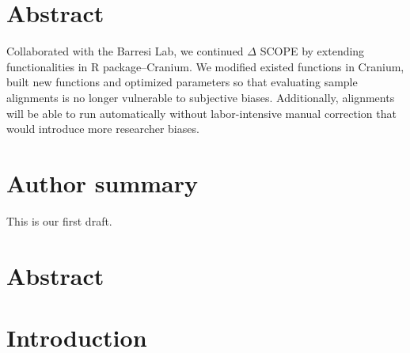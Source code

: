 \documentclass[10pt,letterpaper]{article}
\newcommand{\getIndex}[2]{
  \ForEach{,}{\IfEq{#1}{\thislevelitem}{\number\thislevelcount\ExitForEach}{}}{#2}
}
\newcommand{\getAff}[1]{
  \getIndex{#1}{}
}
\begin{document}
\vspace*{0.2in}

\section*{Abstract}
Collaborated with the Barresi Lab, we continued \(\Delta\) SCOPE by
extending functionalities in R package--Cranium. We modified existed
functions in Cranium, built new functions and optimized parameters so
that evaluating sample alignments is no longer vulnerable to subjective
biases. Additionally, alignments will be able to run automatically
without labor-intensive manual correction that would introduce more
researcher biases.

\section*{Author summary}
This is our first draft.

\linenumbers

\section{Abstract}\label{abstract}

\section{Introduction}\label{introduction}
\end{document}
